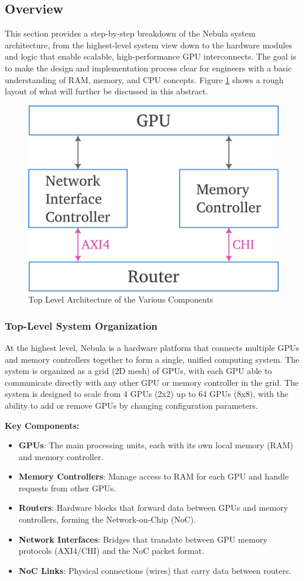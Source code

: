 \documentclass[11pt,a4paper]{article}
\begin{document}
\subsection*{Overview}
This section provides a step-by-step breakdown of the Nebula system architecture, from the highest-level system view down to the hardware modules and logic that enable scalable, high-performance GPU interconnects. The goal is to make the design and implementation process clear for engineers with a basic understanding of RAM, memory, and CPU concepts. Figure \ref{fig:top architecture} shows a rough layout of what will further be discussed in this abstract.
\begin{figure}[h!]
	\centering
	\includegraphics[width=0.35\linewidth]{images/component-architecture.png}
	\caption{Top Level Architecture of the Various Components}
	\label{fig:top architecture}
\end{figure}

\subsubsection{Top-Level System Organization}
At the highest level, Nebula is a hardware platform that connects multiple GPUs and memory controllers together to form a single, unified computing system. The system is organized as a grid (2D mesh) of GPUs, with each GPU able to communicate directly with any other GPU or memory controller in the grid. The system is designed to scale from 4 GPUs (2x2) up to 64 GPUs (8x8), with the ability to add or remove GPUs by changing configuration parameters.

\textbf{Key Components:}
\begin{itemize}
    \item \textbf{GPUs}: The main processing units, each with its own local memory (RAM) and memory controller.
    \item \textbf{Memory Controllers}: Manage access to RAM for each GPU and handle requests from other GPUs.
    \item \textbf{Routers}: Hardware blocks that forward data between GPUs and memory controllers, forming the Network-on-Chip (NoC).
    \item \textbf{Network Interfaces}: Bridges that translate between GPU memory protocols (AXI4/CHI) and the NoC packet format.
    \item \textbf{NoC Links}: Physical connections (wires) that carry data between routers.
\end{itemize}
\end{document}
